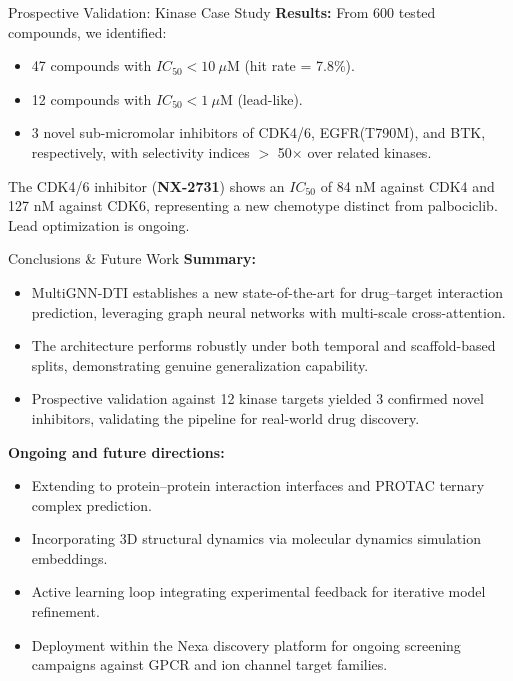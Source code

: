 \documentclass[20pt,landscape]{extarticle}
\begin{document}
\begin{minipage}[t]{0.325\textwidth}
\begin{posterblockteal}{Prospective Validation: Kinase Case Study}
\vspace{4pt}
\textbf{Results:} From 600 tested compounds, we identified:
\begin{itemize}
  \item 47 compounds with $IC_{50} < 10\ \mu\text{M}$ (hit rate = 7.8\%).
  \item 12 compounds with $IC_{50} < 1\ \mu\text{M}$ (lead-like).
  \item 3 novel sub-micromolar inhibitors of CDK4/6, EGFR(T790M), and BTK, respectively, with
        selectivity indices $>$ 50$\times$ over related kinases.
\end{itemize}

The CDK4/6 inhibitor (\textbf{NX-2731}) shows an $IC_{50}$ of 84 nM against CDK4 and 127 nM against CDK6,
representing a new chemotype distinct from palbociclib. Lead optimization is ongoing.
\end{posterblockteal}

\begin{posterblock}{Conclusions \& Future Work}
\textbf{Summary:}
\begin{itemize}
  \item MultiGNN-DTI establishes a new state-of-the-art for drug--target interaction prediction,
        leveraging graph neural networks with multi-scale cross-attention.
  \item The architecture performs robustly under both temporal and scaffold-based splits,
        demonstrating genuine generalization capability.
  \item Prospective validation against 12 kinase targets yielded 3 confirmed novel inhibitors,
        validating the pipeline for real-world drug discovery.
\end{itemize}

\vspace{4pt}
\textbf{Ongoing and future directions:}
\begin{itemize}
  \item Extending to protein--protein interaction interfaces and PROTAC ternary complex prediction.
  \item Incorporating 3D structural dynamics via molecular dynamics simulation embeddings.
  \item Active learning loop integrating experimental feedback for iterative model refinement.
  \item Deployment within the Nexa discovery platform for ongoing screening campaigns against
        GPCR and ion channel target families.
\end{itemize}
\end{posterblock}


\end{minipage}
\end{document}
